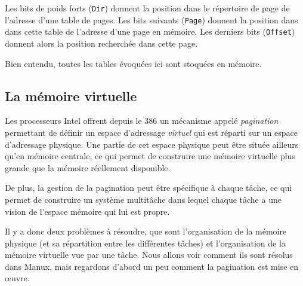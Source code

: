    Les bits de poids forts ({\tt Dir}) donnent la position dans le
répertoire de page de l'adresse d'une table de pages. Les bits
suivants ({\tt Page}) donnent la position dans dans cette table de
l'adresse d'une page en mémoire. Les derniers bits ({\tt Offset})
donnent alors la position recherchée dans cette page.

   Bien entendu, toutes les tables évoquées ici sont stoquées en
mémoire.


\subsection{La mémoire virtuelle}

   Les processeurs Intel offrent depuis le 386 un mécanisme appelé
{\em pagination} permettant de définir un espace d'adressage {\em
virtuel} qui est réparti sur un espace d'adressage physique. Une
partie de cet espace physique peut être située ailleurs qu'en mémoire
centrale, ce qui permet de construire une mémoire virtuelle plus
grande que la mémoire réellement disponible.

   De plus, la gestion de la pagination peut être spécifique à chaque
tâche, ce qui permet de construire un système multitâche dans lequel
chaque tâche a une vision de l'espace mémoire qui lui est propre.

   Il y a donc deux problèmes à résoudre, que sont l'organisation de
la mémoire physique (et sa répartition entre les différentes tâches)
et l'organisation de la mémoire virtuelle vue par une tâche. Nous
allons voir comment ils sont résolus dans Manux, mais regardons
d'abord un peu comment la pagination est mise en \oe{}uvre.

